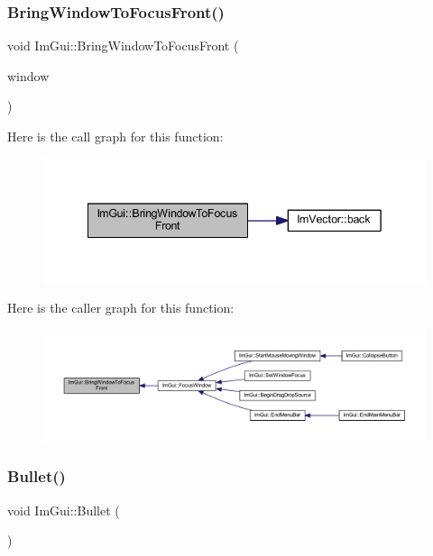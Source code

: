 \subsubsection{\texorpdfstring{Bring\+Window\+To\+Focus\+Front()}{BringWindowToFocusFront()}}
{\footnotesize\ttfamily void Im\+Gui\+::\+Bring\+Window\+To\+Focus\+Front (\begin{DoxyParamCaption}\item[{\mbox{\hyperlink{struct_im_gui_window}{Im\+Gui\+Window}} $\ast$}]{window }\end{DoxyParamCaption})}

Here is the call graph for this function\+:
\nopagebreak
\begin{figure}[H]
\begin{center}
\leavevmode
\includegraphics[width=342pt]{namespace_im_gui_affe95a2dc969f0d15fbd4b588c94ac1a_cgraph}
\end{center}
\end{figure}
Here is the caller graph for this function\+:
\nopagebreak
\begin{figure}[H]
\begin{center}
\leavevmode
\includegraphics[width=350pt]{namespace_im_gui_affe95a2dc969f0d15fbd4b588c94ac1a_icgraph}
\end{center}
\end{figure}
\mbox{\label{namespace_im_gui_ae2d22212681556d2c2398dfd152f3121}} 
\subsubsection{\texorpdfstring{Bullet()}{Bullet()}}
{\footnotesize\ttfamily void Im\+Gui\+::\+Bullet (\begin{DoxyParamCaption}{ }\end{DoxyParamCaption})}

